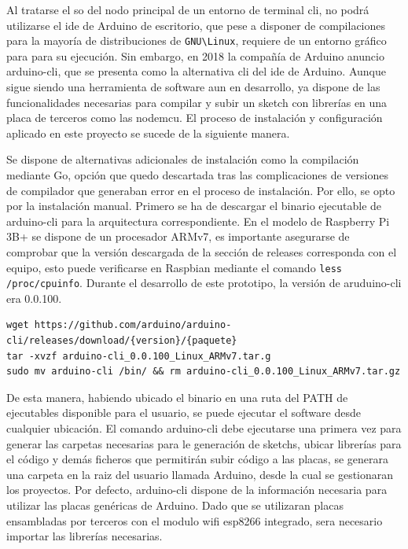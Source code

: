 Al tratarse el \gls{so} del nodo principal de un entorno de terminal \gls{cli}, no podrá utilizarse el \gls{ide} de Arduino de escritorio, que pese a disponer de compilaciones para la mayoría de distribuciones de \verb|GNU\Linux|, requiere de un entorno gráfico para  para su ejecución. Sin embargo, en 2018 la compañía de Arduino anuncio arduino-cli, que se presenta como la alternativa \gls{cli} del \gls{ide} de Arduino. Aunque sigue siendo una herramienta de software aun en desarrollo, ya dispone de las funcionalidades necesarias para compilar y subir un \gls{sketch} con librerías en una placa de terceros como las nodemcu. El proceso de instalación y configuración aplicado en este proyecto se sucede de la siguiente manera.

\vspace{0.5cm}

Se dispone de alternativas adicionales de instalación como la compilación mediante Go, opción que quedo descartada tras las complicaciones de versiones de compilador que generaban error en el proceso de instalación. Por ello, se opto por la instalación manual. Primero se ha de descargar el binario ejecutable de arduino-cli para la arquitectura correspondiente. En el modelo de Raspberry Pi 3B+ se dispone de un procesador ARMv7, es importante asegurarse de comprobar que la versión descargada de la sección de releases corresponda con el equipo, esto puede verificarse en Raspbian mediante el comando \verb|less /proc/cpuinfo|. Durante el desarrollo de este prototipo, la versión de aruduino-cli era 0.0.100. 

\begin{verbatim}
wget https://github.com/arduino/arduino-cli/releases/download/{version}/{paquete}
tar -xvzf arduino-cli_0.0.100_Linux_ARMv7.tar.g
sudo mv arduino-cli /bin/ && rm arduino-cli_0.0.100_Linux_ARMv7.tar.gz
\end{verbatim}

De esta manera, habiendo ubicado el binario en una ruta del PATH de ejecutables disponible para el usuario, se puede ejecutar el software desde cualquier ubicación.
El comando arduino-cli debe ejecutarse una primera vez para generar las carpetas necesarias para le generación de sketchs, ubicar librerías para el código y demás ficheros que permitirán subir código a las placas, se generara una carpeta en la raiz del usuario llamada Arduino, desde la cual se gestionaran los proyectos. Por defecto, arduino-cli dispone de la información necesaria para utilizar las placas genéricas de Arduino. Dado que se utilizaran placas ensambladas por terceros con el modulo \gls{wifi} esp8266 integrado, sera necesario importar las librerías necesarias.

